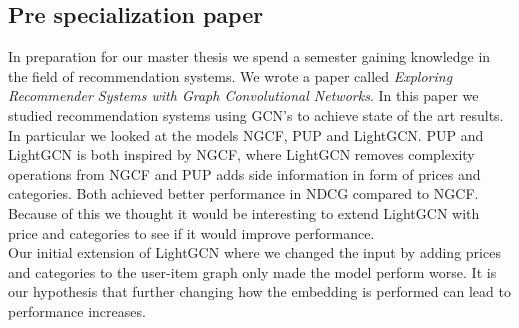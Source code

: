 \subsection{Pre specialization paper}
In preparation for our master thesis we spend a semester gaining knowledge in the field of recommendation systems.
We wrote a paper called \textit{Exploring Recommender Systems with Graph Convolutional Networks}.
In this paper we studied recommendation systems using GCN's to achieve state of the art results.
In particular we looked at the models NGCF, PUP and LightGCN.
PUP and LightGCN is both inspired by NGCF, where LightGCN removes complexity operations from NGCF and PUP adds side information in form of prices and categories.
Both achieved better performance in NDCG compared to NGCF.
Because of this we thought it would be interesting to extend LightGCN with price and categories to see if it would improve performance.
\\
Our initial extension of LightGCN where we changed the input by adding prices and categories to the user-item graph only made the model perform worse.
It is our hypothesis that further changing how the embedding is performed can lead to performance increases.

